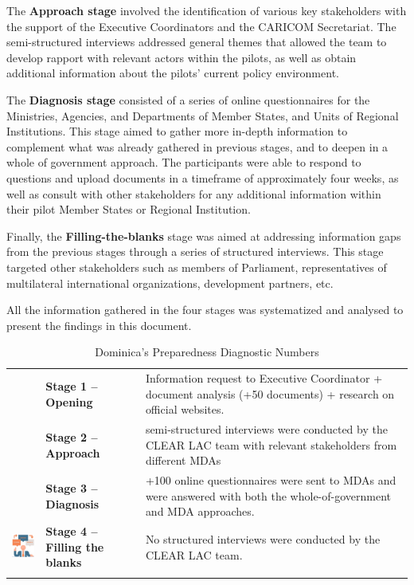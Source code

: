 \documentclass[
  10pt,
]{book}
\begin{document}
The \textbf{Approach stage} involved the identification of various key stakeholders with the support of the Executive Coordinators and the CARICOM Secretariat. The semi-structured interviews addressed general themes that allowed the team to develop rapport with relevant actors within the pilots, as well as obtain additional information about the pilots' current policy environment.

The \textbf{Diagnosis stage} consisted of a series of online questionnaires for the Ministries, Agencies, and Departments of Member States, and Units of Regional Institutions. This stage aimed to gather more in-depth information to complement what was already gathered in previous stages, and to deepen in a whole of government approach. The participants were able to respond to questions and upload documents in a timeframe of approximately four weeks, as well as consult with other stakeholders for any additional information within their pilot Member States or Regional Institution.

Finally, the \textbf{Filling-the-blanks} stage was aimed at addressing information gaps from the previous stages through a series of structured interviews. This stage targeted other stakeholders such as members of Parliament, representatives of multilateral international organizations, development partners, etc.

All the information gathered in the four stages was systematized and analysed to present the findings in this document.

\begin{longtable}[]{@{}
  >{\raggedright\arraybackslash}p{}
  >{\centering\arraybackslash}p{}
  >{\raggedleft\arraybackslash}p{}@{}}
\caption{\label{tab:table1} Dominica's Preparedness Diagnostic Numbers}\tabularnewline
\toprule
\endhead
& \textbf{Stage 1 -- Opening} & Information request to Executive Coordinator + document analysis (+50 documents) + research on official websites. \\
& \textbf{Stage 2 -- Approach} & 7 semi-structured interviews were conducted by the CLEAR LAC team with relevant stakeholders from different MDAs \\
& \textbf{Stage 3 -- Diagnosis} & +100 online questionnaires were sent to MDAs and were answered with both the whole-of-government and MDA approaches. \\
\includegraphics{./images/tb1_4.png} & \textbf{Stage 4 -- Filling the blanks} & No structured interviews were conducted by the CLEAR LAC team. \\
& & \\
\bottomrule
\end{longtable}
\end{document}
